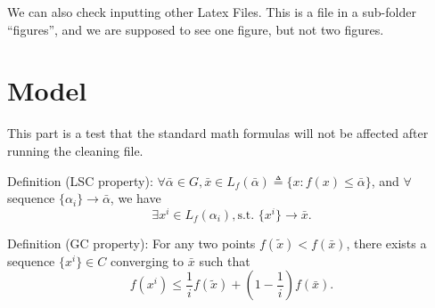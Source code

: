 \documentclass{article}%
\begin{document}
We can also check inputting other Latex Files.
This is a file in a sub-folder ``figures'', and we are supposed to see
one figure, but not two figures. 


% 



\section{Model}

This part is a test that the standard math formulas will not be affected after
running the cleaning file. 

Definition (LSC property): $\forall \bar{\alpha} \in G, \bar{x} \in L_f(\bar{\alpha}) \triangleq \{ x: f(x) \leq \bar{\alpha} \}$,
and $\forall$ sequence $\{ \alpha_i \} \rightarrow \bar{\alpha}$, we have 
$$
\exists x^i \in L_f(\alpha_i), \text{s.t. } \{ x^i\} \rightarrow \bar{x}. 
$$

Definition (GC property): For any two points $ f(\tilde{x}) < f(\bar{x}) $, there exists a sequence $ \{x^i\} \in C$ converging to $ \bar{x} $
such that 
\begin{equation}
f(x^i)\leq \frac{1}{i} f(\tilde{x}) + (1 - \frac{1}{i})f(\bar{x}). 
\end{equation} 


%  
 \vspace{0.3cm}
% 

{\footnotesize

}

%
%
%
\end{document}
